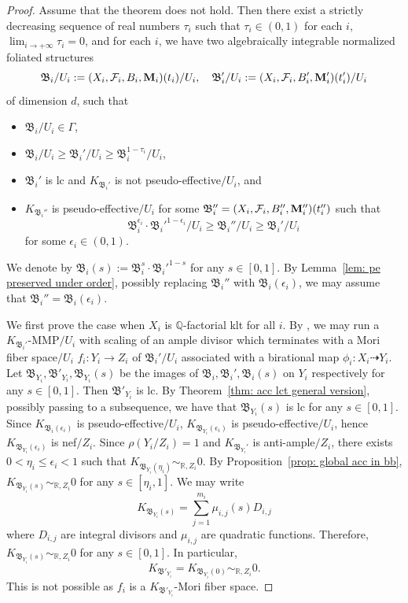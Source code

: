 \documentclass[11pt,reqno]{amsart}
\numberwithin{equation}{section}
\newcommand{\Mm}{{\bf{M}}}
\newcommand{\Bb}{{\mathfrak{B}}}
\newcommand{\Ff}{\mathcal{F}}
\newcommand{\Ii}{\Gamma}
\theoremstyle{definition}
\begin{document}
\begin{proof}
Assume that the theorem does not hold. Then there exist a strictly decreasing sequence of real numbers $\tau_i$ such that $\tau_i\in (0,1)$ for each $i$, $\lim_{i\rightarrow+\infty}\tau_i=0$, and for each $i$, we have two algebraically integrable normalized foliated structures 
       $$\Bb_i/U_i:=(X_i,\Ff_i,B_i,\Mm_i)(t_i)/U_i,\quad \Bb_i'/U_i:=(X_i,\Ff_i,B_i',\Mm_i')(t_i')/U_i$$
      of dimension $d$, such that
       \begin{itemize}
           \item $\Bb_i/U_i\in\Ii$,
           \item        $\Bb_i/U_i\geq\Bb_i'/U_i\geq\Bb_i^{1-\tau_i}/U_i$, 
           \item $\Bb_i'$ is lc and $K_{\Bb_i'}$ is not pseudo-effective$/U_i$, and
           \item $K_{\Bb_i''}$ is pseudo-effective$/U_i$ for some
           $\Bb_i''=(X_i,\Ff_i,B_i'',\Mm_i'')(t_i'')$
           such that
           $$\Bb_i^{\epsilon_i}\cdot\Bb_i'^{1-\epsilon_i}/U_i\geq\Bb_i''/U_i\geq\Bb_i'/U_i$$
           for some $\epsilon_i\in (0,1)$.
       \end{itemize}
       We denote by $\Bb_i(s):=\Bb_i^{s}\cdot\Bb_i'^{1-s}$ for any $s\in [0,1]$. By Lemma~\ref{lem: pe preserved under order}, possibly replacing $\Bb_i''$ with $\Bb_i(\epsilon_i)$, we may assume that $\Bb_i''=\Bb_i(\epsilon_i)$.
    
    We first prove the case when $X_i$ is $\mathbb Q$-factorial klt for all $i$. By \cite[Theorem~2.1.5]{Cas+25a}, we may run a $K_{\Bb_i'}$-MMP$/U_i$ with scaling of an ample divisor which terminates with a Mori fiber space$/U_i$ $f_i: Y_i\rightarrow Z_i$ of $\Bb_i'/U_i$ associated with a birational map $\phi_i: X_i\dashrightarrow Y_i$. Let $\Bb_{Y_i},\Bb'_{Y_i},\Bb_{Y_i}(s)$ be the images of $\Bb_i,\Bb_i',\Bb_i(s)$ on $Y_i$ respectively for any $s\in [0,1]$. Then $\Bb'_{Y_i}$ is lc. By Theorem~\ref{thm: acc lct general version}, possibly passing to a subsequence, we have that $\Bb_{Y_i}(s)$ is lc for any $s\in [0,1]$. Since $K_{\Bb_i(\epsilon_i)}$ is pseudo-effective$/U_i$, $K_{\Bb_{Y_i}(\epsilon_i)}$ is pseudo-effective$/U_i$, hence $K_{\Bb_{Y_i}(\epsilon_i)}$ is nef$/Z_i$. Since $\rho(Y_i/Z_i)=1$ and $K_{\Bb_{Y_i}'}$ is anti-ample$/Z_i$, there exists $0<\eta_i\leq\epsilon_i<1$ such that $K_{\Bb_{Y_i}(\eta_i)}\sim_{\mathbb R,Z_i}0$. By Proposition~\ref{prop: global acc in bb}, $K_{\Bb_{Y_i}(s)}\sim_{\mathbb R,Z_i}0$ for any $s\in [\eta_i,1]$. We may write 
    $$K_{\Bb_{Y_i}(s)}=\sum_{j=1}^{m_i}\mu_{i,j}(s)D_{i,j}$$
    where $D_{i,j}$ are integral divisors and $\mu_{i,j}$ are quadratic functions. Therefore, $K_{\Bb_{Y_i}(s)}\sim_{\mathbb R,Z_i}0$ for any $s\in [0,1]$. In particular, 
    $$K_{\Bb'_{Y_i}}=K_{\Bb_{Y_i}(0)}\sim_{\mathbb R,Z_i}0.$$
    This is not possible as $f_i$ is a $K_{\Bb'_{Y_i}}$-Mori fiber space.
    

\end{proof}
\end{document}
